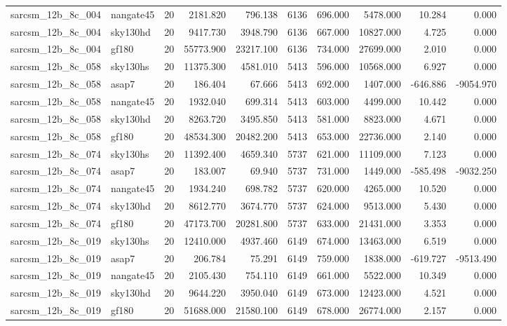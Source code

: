 \begin{longtable}{llrrrrrrrr}
sarcsm\_12b\_8c\_004 & nangate45 & 20 & 2181.820 & 796.138 & 6136 & 696.000 & 5478.000 & 10.284 & 0.000 \\
sarcsm\_12b\_8c\_004 & sky130hd & 20 & 9417.730 & 3948.790 & 6136 & 667.000 & 10827.000 & 4.725 & 0.000 \\
sarcsm\_12b\_8c\_004 & gf180 & 20 & 55773.900 & 23217.100 & 6136 & 734.000 & 27699.000 & 2.010 & 0.000 \\
sarcsm\_12b\_8c\_058 & sky130hs & 20 & 11375.300 & 4581.010 & 5413 & 596.000 & 10568.000 & 6.927 & 0.000 \\
sarcsm\_12b\_8c\_058 & asap7 & 20 & 186.404 & 67.666 & 5413 & 692.000 & 1407.000 & -646.886 & -9054.970 \\
sarcsm\_12b\_8c\_058 & nangate45 & 20 & 1932.040 & 699.314 & 5413 & 603.000 & 4499.000 & 10.442 & 0.000 \\
sarcsm\_12b\_8c\_058 & sky130hd & 20 & 8263.720 & 3495.850 & 5413 & 581.000 & 8823.000 & 4.671 & 0.000 \\
sarcsm\_12b\_8c\_058 & gf180 & 20 & 48534.300 & 20482.200 & 5413 & 653.000 & 22736.000 & 2.140 & 0.000 \\
sarcsm\_12b\_8c\_074 & sky130hs & 20 & 11392.400 & 4659.340 & 5737 & 621.000 & 11109.000 & 7.123 & 0.000 \\
sarcsm\_12b\_8c\_074 & asap7 & 20 & 183.007 & 69.940 & 5737 & 731.000 & 1449.000 & -585.498 & -9032.250 \\
sarcsm\_12b\_8c\_074 & nangate45 & 20 & 1934.240 & 698.782 & 5737 & 620.000 & 4265.000 & 10.520 & 0.000 \\
sarcsm\_12b\_8c\_074 & sky130hd & 20 & 8612.770 & 3674.770 & 5737 & 624.000 & 9513.000 & 5.430 & 0.000 \\
sarcsm\_12b\_8c\_074 & gf180 & 20 & 47173.700 & 20281.800 & 5737 & 633.000 & 21431.000 & 3.353 & 0.000 \\
sarcsm\_12b\_8c\_019 & sky130hs & 20 & 12410.000 & 4937.460 & 6149 & 674.000 & 13463.000 & 6.519 & 0.000 \\
sarcsm\_12b\_8c\_019 & asap7 & 20 & 206.784 & 75.291 & 6149 & 759.000 & 1838.000 & -619.727 & -9513.490 \\
sarcsm\_12b\_8c\_019 & nangate45 & 20 & 2105.430 & 754.110 & 6149 & 661.000 & 5522.000 & 10.349 & 0.000 \\
sarcsm\_12b\_8c\_019 & sky130hd & 20 & 9644.220 & 3950.040 & 6149 & 673.000 & 12423.000 & 4.521 & 0.000 \\
sarcsm\_12b\_8c\_019 & gf180 & 20 & 51688.000 & 21580.100 & 6149 & 678.000 & 26774.000 & 2.157 & 0.000 \\

\end{longtable}
